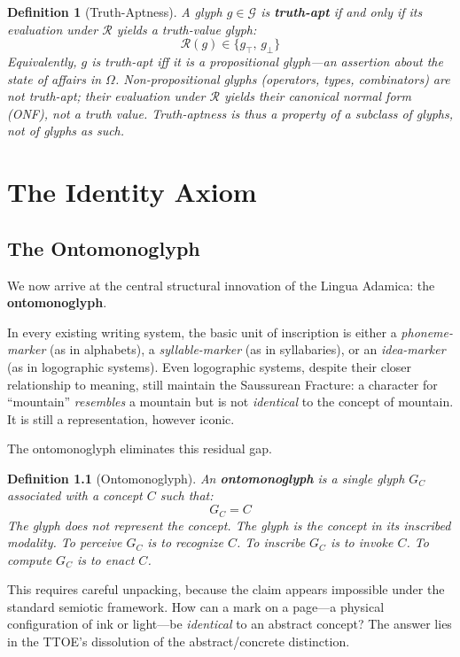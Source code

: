 \documentclass[12pt, letterpaper]{book}
\def\equiv{=}%
\def\mathfrak#1{#1}%
\newtheorem{definition}{Definition}[chapter]
\begin{document}
\begin{definition}[Truth-Aptness]\label{def:truth-apt}
A glyph $\mathfrak{g} \in \mathcal{G}$ is \textbf{truth-apt} if and only if its evaluation under $\mathcal{R}$ yields a truth-value glyph:
\[
\mathcal{R}(\mathfrak{g}) \in \{\mathfrak{g}_\top,\, \mathfrak{g}_\bot\}
\]
Equivalently, $\mathfrak{g}$ is truth-apt iff it is a propositional glyph---an assertion about the state of affairs in $\Omega$. Non-propositional glyphs (operators, types, combinators) are not truth-apt; their evaluation under $\mathcal{R}$ yields their canonical normal form (ONF), not a truth value. Truth-aptness is thus a property of a subclass of glyphs, not of glyphs as such.
\end{definition}


\chapter{The Identity Axiom}

\section{The Ontomonoglyph}

We now arrive at the central structural innovation of the Lingua Adamica: the \textbf{ontomonoglyph}.

In every existing writing system, the basic unit of inscription is either a \textit{phoneme-marker} (as in alphabets), a \textit{syllable-marker} (as in syllabaries), or an \textit{idea-marker} (as in logographic systems). Even logographic systems, despite their closer relationship to meaning, still maintain the Saussurean Fracture: a character for ``mountain'' \textit{resembles} a mountain but is not \textit{identical} to the concept of mountain. It is still a representation, however iconic.

The ontomonoglyph eliminates this residual gap.

\begin{definition}[Ontomonoglyph]\label{def:glyph}
An \textbf{ontomonoglyph} is a single glyph $G_C$ associated with a concept $C$ such that:
\[
G_C \equiv C
\]
The glyph does not \textit{represent} the concept. The glyph \textit{is} the concept in its inscribed modality. To perceive $G_C$ is to recognize $C$. To inscribe $G_C$ is to invoke $C$. To compute $G_C$ is to enact $C$.
\end{definition}

This requires careful unpacking, because the claim appears impossible under the standard semiotic framework. How can a mark on a page---a physical configuration of ink or light---be \textit{identical} to an abstract concept? The answer lies in the TTOE's dissolution of the abstract/concrete distinction.
\end{document}
